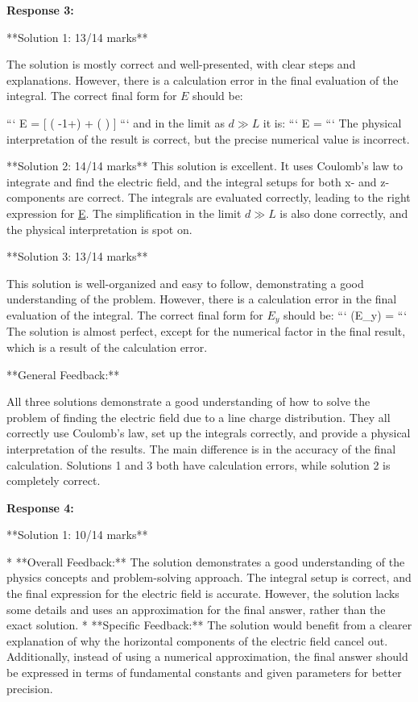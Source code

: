 \documentclass[a4paper,11pt]{article}
\begin{document}
\textbf{Response 3:}

**Solution 1: 13/14 marks**

The solution is mostly correct and well-presented, with clear steps and explanations. However, there is a calculation error in the final evaluation of the integral. The correct final form for \( E \) should be:

```
E =    [  ( -1+)  + (  )  ]
```
and in the limit as \( d \gg L \) it is:
```
E =   
```
The physical interpretation of the result is correct, but the precise numerical value is incorrect.

**Solution 2: 14/14 marks**
This solution is excellent. It uses Coulomb's law to integrate and find the electric field, and the integral setups for both x- and z-components are correct. The integrals are evaluated correctly, leading to the right expression for \underline{E}. The simplification in the limit \( d \gg L \) is also done correctly, and the physical interpretation is spot on.

**Solution 3: 13/14 marks**

This solution is well-organized and easy to follow, demonstrating a good understanding of the problem. However, there is a calculation error in the final evaluation of the integral. The correct final form for \( E_y \) should be:
```
(E_y) =   
```
The solution is almost perfect, except for the numerical factor in the final result, which is a result of the calculation error.

**General Feedback:**

All three solutions demonstrate a good understanding of how to solve the problem of finding the electric field due to a line charge distribution. They all correctly use Coulomb's law, set up the integrals correctly, and provide a physical interpretation of the results. The main difference is in the accuracy of the final calculation. Solutions 1 and 3 both have calculation errors, while solution 2 is completely correct.

\textbf{Response 4:}

**Solution 1: 10/14 marks**

* **Overall Feedback:** The solution demonstrates a good understanding of the physics concepts and problem-solving approach. The integral setup is correct, and the final expression for the electric field is accurate. However, the solution lacks some details and uses an approximation for the final answer, rather than the exact solution.
* **Specific Feedback:** The solution would benefit from a clearer explanation of why the horizontal components of the electric field cancel out. Additionally, instead of using a numerical approximation, the final answer should be expressed in terms of fundamental constants and given parameters for better precision.
\end{document}
